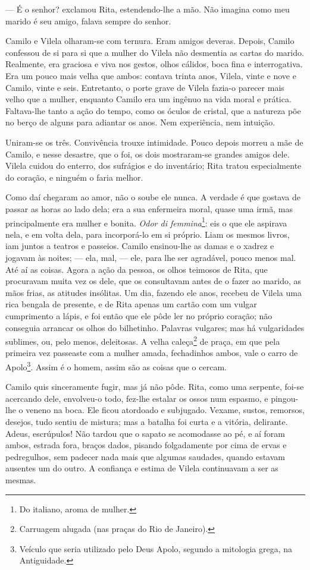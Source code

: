 --- É o senhor? exclamou Rita, estendendo-lhe a mão. Não imagina como meu
marido é seu amigo, falava sempre do senhor.

Camilo e Vilela olharam-se com ternura. Eram amigos deveras. Depois,
Camilo confessou de si para si que a mulher do Vilela não desmentia as
cartas do marido. Realmente, era graciosa e viva nos gestos, olhos
cálidos, boca fina e interrogativa. Era um pouco mais velha que ambos:
contava trinta anos, Vilela, vinte e nove e Camilo, vinte e seis.
Entretanto, o porte grave de Vilela fazia-o parecer mais velho que a
mulher, enquanto Camilo era um ingênuo na vida moral e prática.
Faltava-lhe tanto a ação do tempo, como os óculos de cristal, que a
natureza põe no berço de alguns para adiantar os anos. Nem experiência,
nem intuição.

Uniram-se os três. Convivência trouxe intimidade. Pouco depois morreu a
mãe de Camilo, e nesse desastre, que o foi, os dois mostraram-se grandes
amigos dele. Vilela cuidou do enterro, dos sufrágios e do inventário;
Rita tratou especialmente do coração, e ninguém o faria melhor.

Como daí chegaram ao amor, não o soube ele nunca. A verdade é que
gostava de passar as horas ao lado dela; era a sua enfermeira moral,
quase uma irmã, mas principalmente era mulher e bonita. \emph{Odor di
femmina}\footnote{Do italiano, aroma de mulher.}: eis o que ele aspirava
nela, e em volta dela, para incorporá-lo em si próprio. Liam os mesmos
livros, iam juntos a teatros e passeios. Camilo ensinou-lhe as damas e o
xadrez e jogavam às noites; --- ela, mal, --- ele, para lhe ser agradável,
pouco menos mal. Até aí as coisas. Agora a ação da pessoa, os olhos
teimosos de Rita, que procuravam muita vez os dele, que os consultavam
antes de o fazer ao marido, as mãos frias, as atitudes insólitas. Um
dia, fazendo ele anos, recebeu de Vilela uma rica bengala de presente, e
de Rita apenas um cartão com um vulgar cumprimento a lápis, e foi então
que ele pôde ler no próprio coração; não conseguia arrancar os olhos do
bilhetinho. Palavras vulgares; mas há vulgaridades sublimes, ou, pelo
menos, deleitosas. A velha caleça\footnote{Carruagem alugada (nas praças
  do Rio de Janeiro).} de praça, em que pela primeira vez passeaste com
a mulher amada, fechadinhos ambos, vale o carro de Apolo\footnote{Veículo
  que seria utilizado pelo Deus Apolo, segundo a mitologia grega, na
  Antiguidade.}. Assim é o homem, assim são as coisas que o cercam.

Camilo quis sinceramente fugir, mas já não pôde. Rita, como uma
serpente, foi-se acercando dele, envolveu-o todo, fez-lhe estalar os
ossos num espasmo, e pingou-lhe o veneno na boca. Ele ficou atordoado e
subjugado. Vexame, sustos, remorsos, desejos, tudo sentiu de mistura;
mas a batalha foi curta e a vitória, delirante. Adeus, escrúpulos! Não
tardou que o sapato se acomodasse ao pé, e aí foram ambos, estrada fora,
braços dados, pisando folgadamente por cima de ervas e pedregulhos, sem
padecer nada mais que algumas saudades, quando estavam ausentes um do
outro. A confiança e estima de Vilela continuavam a ser as mesmas.

